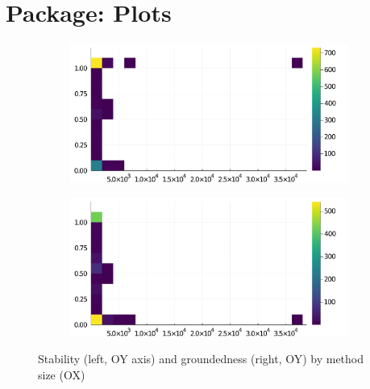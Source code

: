 \section*{Package: Plots}
\begin{figure}[h]
     \begin{subfigure}[b]{0.49\textwidth}
       \includegraphics[width=\textwidth]{figs/all-package-graphs/Plots-size-vs-stable.pdf}
     \end{subfigure}
     \begin{subfigure}[b]{0.49\textwidth}
       \includegraphics[width=\textwidth]{figs/all-package-graphs/Plots-size-vs-grounded.pdf}
     \end{subfigure}
\caption{Stability (left, OY axis) and groundedness (right, OY) by method size (OX)}%
%
\label{figs:size:Plots}
\end{figure}

